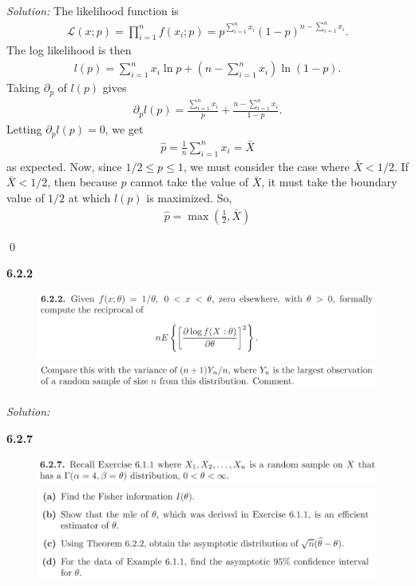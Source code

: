 \documentclass{book}
\theoremstyle{definition}
\newcommand{\p}{\partial}
\newcommand{\lag}{\mathcal{L}}
\newcommand{\f}[2]{\frac{#1}{#2}}
\newcommand{\lp}{\left(}
\newcommand{\rp}{\right)}
\begin{document}
\noindent \textit{Solution:} The likelihood function is 
\begin{align}
\lag(x;p) = \prod^n_{i=1}f(x_i;p) = p^{\sum_{i=1}^n x_i}(1-p)^{n-\sum^n_{i=1}x_i}.
\end{align}
The log likelihood is then
\begin{align}
l(p) = \sum_{i=1}^n x_i \ln p + \lp n - \sum^n_{i=1}x_i \rp \ln (1-p).
\end{align}
Taking $\p_p$ of $l(p)$ gives
\begin{align}
\p_p l(p) = \f{\sum^n_{i=1}x_i}{p} + \f{n - \sum^n_{i=1}x_i}{1-p}.
\end{align}
Letting $\p_p l(p) = 0$, we get
\begin{align}
\hat{p} = \f{1}{n}\sum^n_{i=1}x_i = \bar{X}
\end{align}
as expected. Now, since $1/2 \leq p \leq 1$, we must consider the case where $\bar{X} < 1/2$. If $\bar{X} < 1/2$, then because $p$ cannot take the value of $\bar{X}$, it must take the boundary value of $1/2$ at which $l(p)$ is maximized. So, 
\begin{align}
\boxed{\hat{p} = \max \lp \f{1}{2},\bar{X} \rp}
\end{align}

\qed











\newpage
\noindent \textbf{6.2.2}
\begin{figure}[!htb]
	\centering
	\includegraphics[scale=0.25]{622a}
	\includegraphics[scale=0.25]{622b}
\end{figure}

\noindent \textit{Solution:}












\newpage
\noindent \textbf{6.2.7}
\begin{figure}[!htb]
	\centering
	\includegraphics[scale=0.25]{627a}
	\includegraphics[scale=0.25]{627b}
\end{figure}
\end{document}
